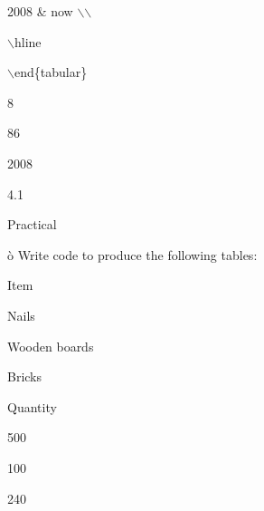 \documentclass[a4paper,portrait,12pt]{article}
\begin{document}
\begin{flushleft}
2008 \& now \ensuremath{\backslash}\ensuremath{\backslash}
\end{flushleft}


\begin{flushleft}
\ensuremath{\backslash}hline
\end{flushleft}


\begin{flushleft}
\ensuremath{\backslash}end\{tabular\}
\end{flushleft}





8


86


2008





4.1





\begin{flushleft}
Practical
\end{flushleft}





\begin{flushleft}
\`{o} Write code to produce the following tables:
\end{flushleft}


\begin{flushleft}
Item
\end{flushleft}


\begin{flushleft}
Nails
\end{flushleft}


\begin{flushleft}
Wooden boards
\end{flushleft}


\begin{flushleft}
Bricks
\end{flushleft}





\begin{flushleft}
Quantity
\end{flushleft}


500


100


240
\end{document}
